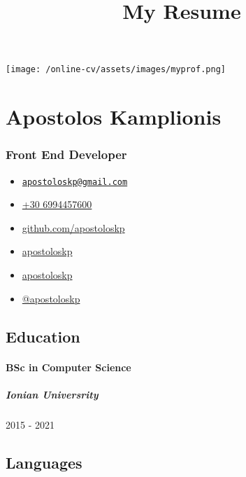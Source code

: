 \documentclass[
  english,
]{article}
\title{My Resume}
\author{}
\date{}
\providecommand{\tightlist}{%
  \setlength{\itemsep}{0pt}\setlength{\parskip}{0pt}}
\begin{document}
\maketitle

\texttt{[image: /online-cv/assets/images/myprof.png]}

\hypertarget{apostolos-kamplionis}{%
\section{Apostolos Kamplionis}\label{apostolos-kamplionis}}

\hypertarget{front-end-developer}{%
\subsubsection{Front End Developer}\label{front-end-developer}}

\begin{itemize}
\tightlist
\item
  \emph{}
  \href{mailto:apostoloskp@gmail.com}{\nolinkurl{apostoloskp@gmail.com}}
\item
  \emph{} \href{tel:+30\%206994457600}{+30 6994457600}
\item
  \emph{} \href{http://github.com/apostoloskp}{github.com/apostoloskp}
\item
  \emph{} \href{https://linkedin.com/in/apostoloskp}{apostoloskp}
\item
  \emph{} \href{http://github.com/apostoloskp}{apostoloskp}
\item
  \emph{} \href{https://twitter.com/@apostoloskp}{@apostoloskp}
\end{itemize}

\hypertarget{education}{%
\subsection{Education}\label{education}}

\hypertarget{bsc-in-computer-science}{%
\paragraph{BSc in Computer Science}\label{bsc-in-computer-science}}

\hypertarget{ionian-universrity}{%
\subparagraph{Ionian Universrity}\label{ionian-universrity}}

2015 - 2021

\hypertarget{languages}{%
\subsection{Languages}\label{languages}}
\end{document}
